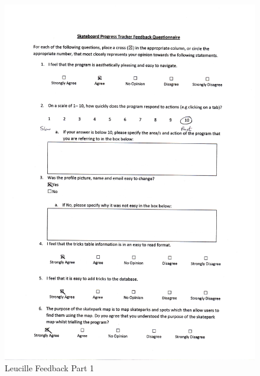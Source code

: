 \begin{itemize}
\begin{figure}[H]
    \includegraphics[width=\textwidth]{./Evaluation/images/LeucilleFeedback1.pdf}
    \caption{Leucille Feedback Part 1} \label{fig:LeucilleFeedback1}
\end{figure}


\end{itemize}
